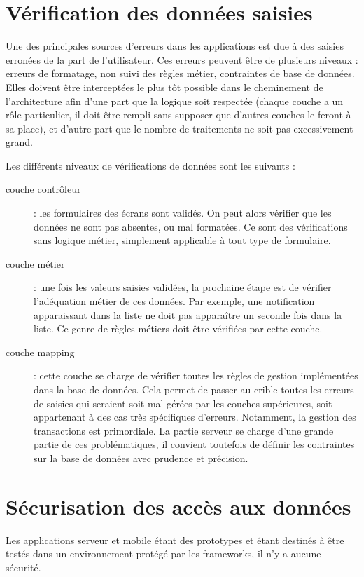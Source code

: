 \documentclass[a4paper,12pt]{report}
\begin{document}
\begin{onehalfspace}
\section{Vérification des données saisies}
  Une des principales sources d’erreurs dans les applications est due à des saisies erronées de la part de l’utilisateur. Ces erreurs peuvent être de plusieurs niveaux : erreurs de formatage, non suivi des règles métier, contraintes de base de données. Elles doivent être interceptées le plus tôt possible dans le cheminement de l’architecture afin d’une part que la logique soit respectée (chaque couche a un rôle particulier, il doit être  rempli sans supposer que d’autres couches le feront à sa place), et d’autre part que le nombre de traitements ne soit pas excessivement grand.

Les différents niveaux de vérifications de données sont les suivants :
\begin{description}
\item[couche contrôleur] : les formulaires des écrans sont validés. On peut alors vérifier que les données ne sont pas absentes, ou mal formatées. Ce sont des vérifications sans logique métier, simplement applicable à tout type de formulaire.
\item[couche métier] : une fois les valeurs saisies validées, la prochaine étape est de vérifier l’adéquation métier de ces données. Par exemple, une notification apparaissant dans la liste ne doit pas apparaître un seconde fois dans la liste. Ce genre de règles métiers doit être vérifiées par cette couche.
\item[couche mapping] : cette couche se charge de vérifier toutes les règles de gestion implémentées dans la base de données. Cela permet de passer au crible toutes les erreurs de saisies qui seraient soit mal gérées par les couches supérieures, soit appartenant à des cas très spécifiques d’erreurs. Notamment, la gestion des transactions est primordiale. La partie serveur se charge d’une grande partie de ces problématiques, il convient toutefois de définir les contraintes sur la base de données avec prudence et précision.
\end{description}

\section{Sécurisation des accès aux données}
  Les applications serveur et mobile étant des prototypes et étant destinés à être testés dans un environnement protégé par les frameworks, il n'y a aucune sécurité.


\end{onehalfspace}
\end{document}
